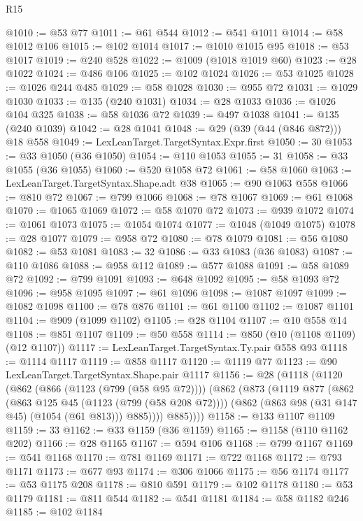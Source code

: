 \begin{lexlean}{R15}
\begin{coremodule}
@1010 := @53 @77
@1011 := @61 @544
@1012 := @541 @1011
@1014 := @58 @1012 @106
@1015 := @102 @1014
@1017 := @1010 @1015 @95
@1018 := @53 @1017
@1019 := @240 @528
@1022 := @1009 (@1018 @1019 @60)
@1023 := @28 @1022
@1024 := @486 @106
@1025 := @102 @1024
@1026 := @53 @1025
@1028 := @1026 @244 @485
@1029 := @58 @1028
@1030 := @955 @72
@1031 := @1029 @1030
@1033 := @135 (@240 @1031)
@1034 := @28 @1033
@1036 := @1026 @104 @325
@1038 := @58 @1036 @72
@1039 := @497 @1038
@1041 := @135 (@240 @1039)
@1042 := @28 @1041
@1048 := @29 (@39 (@44 (@846 @872))) @18 @558
@1049 := LexLeanTarget.TargetSyntax.Expr.first
@1050 := 30
@1053 := @33 @1050 (@36 @1050)
@1054 := @110 @1053
@1055 := 31
@1058 := @33 @1055 (@36 @1055)
@1060 := @520 @1058 @72
@1061 := @58 @1060
@1063 := LexLeanTarget.TargetSyntax.Shape.adt @38
@1065 := @90 @1063 @558
@1066 := @810 @72
@1067 := @799 @1066
@1068 := @78 @1067
@1069 := @61 @1068
@1070 := @1065 @1069
@1072 := @58 @1070 @72
@1073 := @939 @1072
@1074 := @1061 @1073
@1075 := @1054 @1074
@1077 := @1048 (@1049 @1075)
@1078 := @28 @1077
@1079 := @958 @72
@1080 := @78 @1079
@1081 := @56 @1080
@1082 := @53 @1081
@1083 := 32
@1086 := @33 @1083 (@36 @1083)
@1087 := @110 @1086
@1088 := @958 @112
@1089 := @577 @1088
@1091 := @58 @1089 @72
@1092 := @799 @1091
@1093 := @648 @1092
@1095 := @58 @1093 @72
@1096 := @958 @1095
@1097 := @61 @1096
@1098 := @1087 @1097
@1099 := @1082 @1098
@1100 := @78 @876
@1101 := @61 @1100
@1102 := @1087 @1101
@1104 := @909 (@1099 @1102)
@1105 := @28 @1104
@1107 := @10 @558 @14
@1108 := @851 @1107
@1109 := @50 @558
@1114 := @850 (@10 (@1108 @1109) (@12 @1107))
@1117 := LexLeanTarget.TargetSyntax.Ty.pair @558 @93
@1118 := @1114 @1117
@1119 := @858 @1117
@1120 := @1119 @77
@1123 := @90 LexLeanTarget.TargetSyntax.Shape.pair @1117
@1156 := @28
    (@1118
      (@1120
        (@862
          (@866 (@1123 (@799 (@58 @95 @72))))
          (@862
            (@873
              (@1119
                @877
                (@862
                  (@863 @125 @45 (@1123 (@799 (@58 @208 @72))))
                  (@862 (@863 @98 (@31 @147 @45) (@1054 (@61 @813))) @885))))
            @885))))
@1158 := @133 @1107 @1109
@1159 := 33
@1162 := @33 @1159 (@36 @1159)
@1165 := @1158 (@110 @1162 @202)
@1166 := @28 @1165
@1167 := @594 @106
@1168 := @799 @1167
@1169 := @541 @1168
@1170 := @781 @1169
@1171 := @722 @1168
@1172 := @793 @1171
@1173 := @677 @93
@1174 := @306 @1066
@1175 := @56 @1174
@1177 := @53 @1175 @208
@1178 := @810 @591
@1179 := @102 @1178
@1180 := @53 @1179
@1181 := @811 @544
@1182 := @541 @1181
@1184 := @58 @1182 @246
@1185 := @102 @1184

\end{coremodule}
\end{lexlean}
